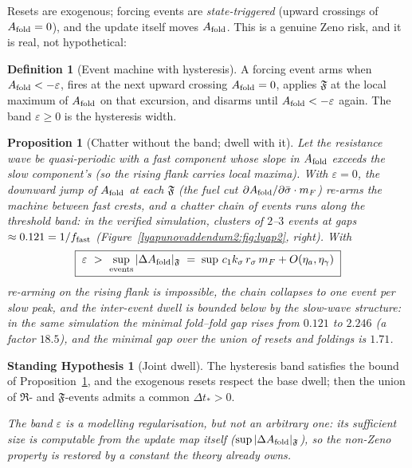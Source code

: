 \documentclass[11pt,a4paper,oneside]{book}
\newcommand{\note}[1]{\textcolor{black!65}{\emph{#1}}}
\newcommand{\reset}{\mathfrak{R}}
\newcommand{\Af}{A_{\rm fold}}
\newcommand{\rs}{r_\sigma}
\newcommand{\fold}{\mathfrak{F}}
\theoremstyle{plain}
\newtheorem{proposition}{Proposition}[chapter]
\theoremstyle{definition}
\newtheorem{definition}{Definition}[chapter]
\newtheorem{assumption}{Standing Hypothesis}[chapter]
\theoremstyle{remark}
\begin{document}
Resets are exogenous; forcing events are \emph{state-triggered} (upward crossings of $\Af=0$), and the
update itself moves $\Af$. This is a genuine Zeno risk, and it is real, not hypothetical:

\begin{definition}[Event machine with hysteresis]\label{lyapunovaddendum2:def:hyst}
A forcing event arms when $\Af<-\varepsilon$, fires at the next upward crossing $\Af=0$, applies
$\fold$ at the local maximum of $\Af$ on that excursion, and disarms until $\Af<-\varepsilon$ again.
The band $\varepsilon\ge0$ is the hysteresis width.
\end{definition}

\begin{proposition}[Chatter without the band; dwell with it]\label{lyapunovaddendum2:prop:zeno}
Let the resistance wave be quasi-periodic with a fast component whose slope in $\Af$ exceeds the slow
component's (so the rising flank carries local maxima). With $\varepsilon=0$, the downward jump of
$\Af$ at each $\fold$ (the fuel cut $\partial\Af/\partial\bar\sigma\cdot m_F$) re-arms the machine
between fast crests, and a \emph{chatter chain} of events runs along the threshold band: in the verified
simulation, clusters of $2$--$3$ events at gaps $\approx0.121=1/f_{\rm fast}$
(Figure~\ref{lyapunovaddendum2:fig:lyap2}, right). With
\begin{equation}
\boxed{\;\varepsilon\ >\ \sup_{\rm events}|\Delta\Af|_{\fold}
\;=\;\sup\,c_1k_\sigma\,\rs\,m_F+O(\eta_a,\eta_\gamma)\;}
\end{equation}
re-arming on the rising flank is impossible, the chain collapses to one event per slow peak, and the
inter-event dwell is bounded below by the slow-wave structure: in the same simulation the minimal
fold--fold gap rises from $0.121$ to $2.246$ (a factor $18.5$), and the minimal gap over the
\emph{union} of resets and foldings is $1.71$.
\end{proposition}

\begin{assumption}[Joint dwell]\label{lyapunovaddendum2:H:dwell}
The hysteresis band satisfies the bound of Proposition~\ref{lyapunovaddendum2:prop:zeno}, and the exogenous resets respect
the base dwell; then the union of $\reset$- and $\fold$-events admits a common $\Delta t_\ast>0$.
\end{assumption}

\note{The band $\varepsilon$ is a modelling regularisation, but not an arbitrary one: its sufficient size
is computable from the update map itself ($\sup|\Delta\Af|_{\fold}$), so the non-Zeno property is
restored by a constant the theory already owns.}
\end{document}
